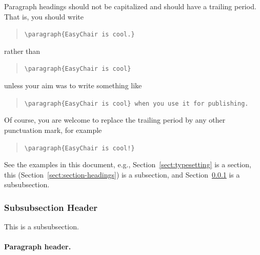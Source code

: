\documentclass{easychair}
\begin{document}
Paragraph headings should not be capitalized and should have a
trailing period. That is, you should write

\begin{quote}
\verb|\paragraph{EasyChair is cool.}|
\end{quote}
rather than 

\begin{quote}
\verb|\paragraph{EasyChair is cool}|
\end{quote}
unless your aim was to write something like

\begin{quote}
\verb|\paragraph{EasyChair is cool} when you use it for publishing.| 
\end{quote}
Of course, you are welcome to replace the trailing period by any other
punctuation mark, for example 

\begin{quote}
\verb|\paragraph{EasyChair is cool!}|
\end{quote}

See the examples in this document, e.g.,
Section~\ref{sect:typesetting} is a section, this 
(Section~\ref{sect:section-headings}) is a subsection, and
Section~\ref{sect:subsubsection-headings} is a subsubsection.

\subsubsection{Subsubsection Header}
\label{sect:subsubsection-headings}

This is a subsubsection. 

\paragraph{Paragraph header.}
\end{document}
